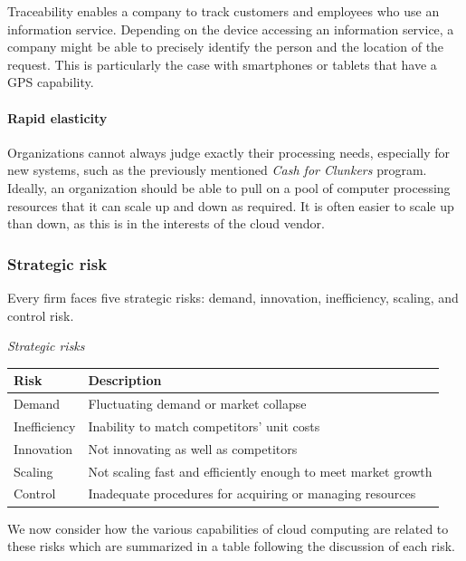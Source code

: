 \documentclass[
]{article}
\begin{document}
Traceability enables a company to track customers and employees who use
an information service. Depending on the device accessing an information
service, a company might be able to precisely identify the person and
the location of the request. This is particularly the case with
smartphones or tablets that have a GPS capability.

\hypertarget{rapid-elasticity}{%
\paragraph*{Rapid elasticity}\label{rapid-elasticity}}

Organizations cannot always judge exactly their processing needs,
especially for new systems, such as the previously mentioned \emph{Cash for
Clunkers} program. Ideally, an organization should be able to pull on a
pool of computer processing resources that it can scale up and down as
required. It is often easier to scale up than down, as this is in the
interests of the cloud vendor.

\hypertarget{strategic-risk}{%
\subsubsection*{Strategic risk}\label{strategic-risk}}

Every firm faces five strategic risks: demand, innovation, inefficiency,
scaling, and control risk.

\emph{Strategic risks}

\begin{longtable}[]{@{}ll@{}}
\toprule
Risk & Description \\
\midrule
\endhead
Demand & Fluctuating demand or market collapse \\
Inefficiency & Inability to match competitors' unit costs \\
Innovation & Not innovating as well as competitors \\
Scaling & Not scaling fast and efficiently enough to meet market growth \\
Control & Inadequate procedures for acquiring or managing resources \\
\bottomrule
\end{longtable}

We now consider how the various capabilities of cloud computing are
related to these risks which are summarized in a table following the
discussion of each risk.
\end{document}
